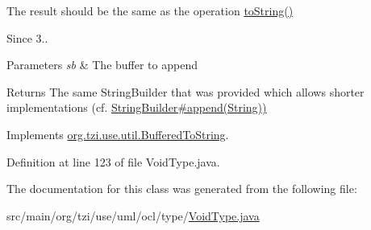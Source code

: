 The result should be the same as the operation \hyperlink{classorg_1_1tzi_1_1use_1_1uml_1_1ocl_1_1type_1_1_type_impl_a36d68452942c6f779d8c2adaaaf700f8}{to\-String()} 

\begin{DoxySince}{Since}
3.. 
\end{DoxySince}

\begin{DoxyParams}{Parameters}
{\em sb} & The buffer to append \\
\hline
\end{DoxyParams}
\begin{DoxyReturn}{Returns}
The same String\-Builder that was provided which allows shorter implementations (cf. \hyperlink{}{String\-Builder\#append(\-String))} 
\end{DoxyReturn}


Implements \hyperlink{interfaceorg_1_1tzi_1_1use_1_1util_1_1_buffered_to_string_aea95e4e53b18818d50ee253700e6e2d5}{org.\-tzi.\-use.\-util.\-Buffered\-To\-String}.



Definition at line 123 of file Void\-Type.\-java.



The documentation for this class was generated from the following file\-:\begin{DoxyCompactItemize}
\item 
src/main/org/tzi/use/uml/ocl/type/\hyperlink{_void_type_8java}{Void\-Type.\-java}\end{DoxyCompactItemize}
